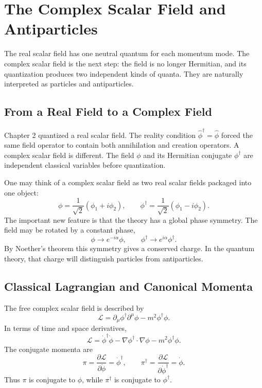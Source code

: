 \chapter{The Complex Scalar Field and Antiparticles}

\begin{remarkbox}
The real scalar field has one neutral quantum for each momentum mode. The
complex scalar field is the next step: the field is no longer Hermitian, and its
quantization produces two independent kinds of quanta. They are naturally
interpreted as particles and antiparticles.
\end{remarkbox}

\section{From a Real Field to a Complex Field}

Chapter 2 quantized a real scalar field. The reality condition
\(\hat\phi^\dagger=\hat\phi\) forced the same field operator to contain both
annihilation and creation operators. A complex scalar field is different. The
field \(\phi\) and its Hermitian conjugate \(\phi^\dagger\) are independent
classical variables before quantization.

One may think of a complex scalar field as two real scalar fields packaged into
one object:
\[
    \phi
    = \frac{1}{\sqrt{2}}(\phi_1+i\phi_2),
    \qquad
    \phi^\dagger
    = \frac{1}{\sqrt{2}}(\phi_1-i\phi_2).
\]
The important new feature is that the theory has a global phase symmetry. The
field may be rotated by a constant phase,
\[
    \phi\longrightarrow e^{-i\alpha}\phi,
    \qquad
    \phi^\dagger\longrightarrow e^{i\alpha}\phi^\dagger.
\]
By Noether's theorem this symmetry gives a conserved charge. In the quantum
theory, that charge will distinguish particles from antiparticles.

\section{Classical Lagrangian and Canonical Momenta}

The free complex scalar field is described by
\[
    \mathcal{L}
    = \partial_\mu\phi^\dagger\partial^\mu\phi
      - m^2\phi^\dagger\phi.
\]
In terms of time and space derivatives,
\[
    \mathcal{L}
    = \dot\phi^\dagger\dot\phi
      - \nabla\phi^\dagger\cdot\nabla\phi
      - m^2\phi^\dagger\phi.
\]
The conjugate momenta are
\[
    \pi
    = \frac{\partial\mathcal{L}}{\partial\dot\phi}
    = \dot\phi^\dagger,
    \qquad
    \pi^\dagger
    = \frac{\partial\mathcal{L}}{\partial\dot\phi^\dagger}
    = \dot\phi.
\]
Thus \(\pi\) is conjugate to \(\phi\), while \(\pi^\dagger\) is conjugate to
\(\phi^\dagger\).

